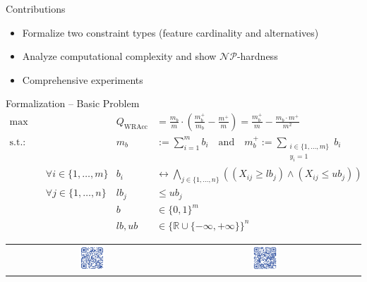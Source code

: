 \documentclass[USenglish]{article} %
\begin{document}
\begin{minipage}[t]{0.49\textwidth}
\begin{standardbox}{Contributions}
\begin{itemize}
			\item Formalize two constraint types (feature cardinality and alternatives)
			\item Analyze computational complexity and show $\mathcal{NP}$-hardness
			\item Comprehensive experiments
		\end{itemize}
	\end{standardbox}
	\vspace{10pt}
	\begin{standardbox}{Formalization -- Basic Problem}
		\begin{align*}
			\max &\quad & Q_{\text{WRAcc}} &= \frac{m_b}{m} \cdot \left( \frac{m_b^+}{m_b} - \frac{m^+}{m} \right) = \frac{m_b^+}{m} - \frac{m_b \cdot m^+}{m^2} \\
			\text{s.t.:} &\quad & m_b &:= \sum_{i=1}^{m} b_i \quad\text{and}\quad m_b^+ := \sum_{\substack{i \in \{1, \dots, m\} \\ y_i = 1 }} b_i \\
			&\quad \forall i \in \{1, \dots, m\} & b_i &\leftrightarrow \bigwedge_{j \in \{1, \dots, n\}} \left( \left( X_{ij} \geq \mathit{lb}_j \right) \land \left( X_{ij} \leq \mathit{ub}_j \right) \right) \\
			&\quad \forall j \in \{1, \dots, n\} & \mathit{lb}_j &\leq \mathit{ub}_j \\
			&\quad & b &\in \{0, 1\}^m \\
			&\quad & \mathit{lb}, \mathit{ub} &\in \{\mathbb{R} \cup \{-\infty, +\infty\}\}^n
		\end{align*}
	\end{standardbox}
	\vspace{10pt}
	\setlength{\tabcolsep}{30pt} %
	\centering
	\begin{tabular}{ccc} %
		\includegraphics[width=0.15\textwidth]{qr_codes/qr-code-paper.pdf} &
		\includegraphics[width=0.15\textwidth]{qr_codes/qr-code-github.pdf} &

\end{tabular}
\end{minipage}
\end{document}
